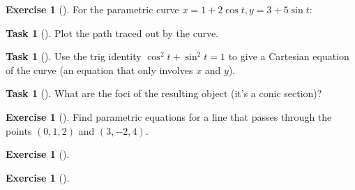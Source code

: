 \documentclass[10pt,]{book}
\theoremstyle{plain}
\theoremstyle{definition}
\theoremstyle{definition}
\theoremstyle{definition}
\theoremstyle{definition}
\newtheorem{exploration}[project]{Exercise}
\newtheorem{task}[project]{Task}
\theoremstyle{definition}
\numberwithin{equation}{section}
\begin{document}
\begin{exploration}[]\label{exploration-73}
For the parametric curve \(x=1+2\cos t, y=3+5\sin t\):%
\begin{task}[]\label{task-119}
Plot the path traced out by the curve.%
\end{task}
\begin{task}[]\label{task-120}
Use the trig identity \(\cos^2t+\sin^2t=1\) to give a Cartesian equation of the curve (an equation that only involves \(x\) and \(y\)).%
\end{task}
\begin{task}[]\label{task-121}
What are the foci of the resulting object (it's a conic section)?%
\end{task}
\end{exploration}
\begin{exploration}[]\label{prob_line_equation_practice}
Find parametric equations for a line that passes through the points \((0,1,2)\) and \((3,-2,4)\).%
\end{exploration}
\begin{exploration}[]\label{exploration-75}
\end{exploration}
\begin{exploration}[]\label{exploration-76}
\end{exploration}
\typeout{************************************************}
\typeout{************************************************}
\end{document}
